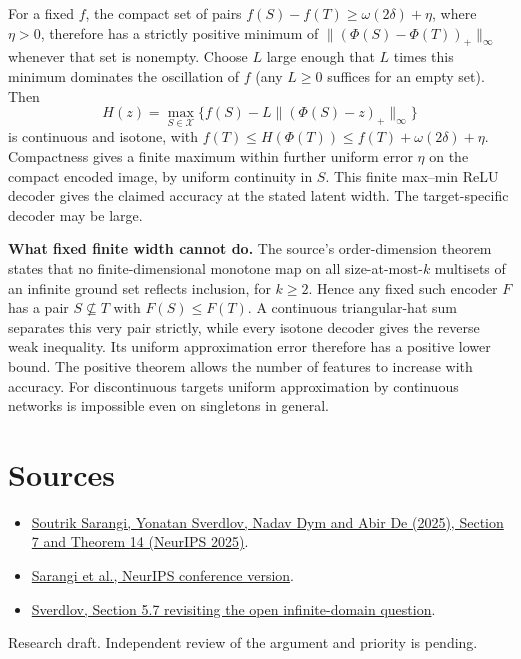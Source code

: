\documentclass[10pt]{article}
\begin{document}
For a fixed $f$, the compact set of pairs $f(S)-f(T)\ge\omega(2\delta)+\eta$, where $\eta>0$, therefore has a strictly positive minimum of $\|(\Phi(S)-\Phi(T))_+\|_\infty$ whenever that set is nonempty. Choose $L$ large enough that $L$ times this minimum dominates the oscillation of $f$ (any $L\ge0$ suffices for an empty set). Then
\[
 H(z)=\max_{S\in\mathcal X}\{f(S)-L\|(\Phi(S)-z)_+\|_\infty\}
\]
is continuous and isotone, with $f(T)\le H(\Phi(T))\le f(T)+\omega(2\delta)+\eta$. Compactness gives a finite maximum within further uniform error $\eta$ on the compact encoded image, by uniform continuity in $S$. This finite max--min ReLU decoder gives the claimed accuracy at the stated latent width. The target-specific decoder may be large.

\textbf{What fixed finite width cannot do.} The source's order-dimension theorem states that no finite-dimensional monotone map on all size-at-most-$k$ multisets of an infinite ground set reflects inclusion, for $k\ge2$. Hence any fixed such encoder $F$ has a pair $S\not\subseteq T$ with $F(S)\le F(T)$. A continuous triangular-hat sum separates this very pair strictly, while every isotone decoder gives the reverse weak inequality. Its uniform approximation error therefore has a positive lower bound. The positive theorem allows the number of features to increase with accuracy. For discontinuous targets uniform approximation by continuous networks is impossible even on singletons in general.

\section*{Sources}
\begin{itemize}
\item \href{https://arxiv.org/abs/2510.23634}{Soutrik Sarangi, Yonatan Sverdlov, Nadav Dym and Abir De (2025), Section 7 and Theorem 14 (NeurIPS 2025)}.
\item \href{https://proceedings.neurips.cc/paper_files/paper/2025/hash/57162bd1bde82ab19d75d6d13fe34e0c-Abstract-Conference.html}{Sarangi et al., NeurIPS conference version}.
\item \href{https://arxiv.org/abs/2611.20020}{Sverdlov, Section 5.7 revisiting the open infinite-domain question}.
\end{itemize}
{\small Research draft. Independent review of the argument and priority is pending.}
\end{document}
